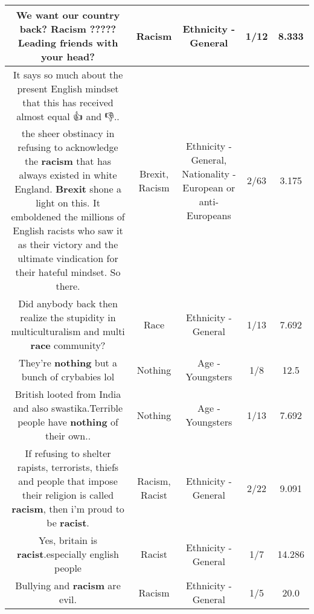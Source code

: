 \documentclass[11pt]{article}
\newlength\mylength
\begin{document}
\begin{center}
\begin{longtable}{|C{.65\mylength}|C{.30\mylength}|C{.12\mylength}|C{.12\mylength}|C{.12\mylength}|}
  \small We want our country back? \textbf{Racism} ????? Leading friends with your head?\normalsize   & Racism & Ethnicity - General & 1/12 & 8.333 \\  \hline
  \small It says so much about the present English mindset that this has received almost equal 👍 and 👎.. the sheer obstinacy in refusing to acknowledge the \textbf{racism} that has always existed in white England. \textbf{Brexit} shone a light on this. It emboldened the millions of English racists who saw it as their victory and the ultimate vindication for their hateful mindset. So there.\normalsize   & Brexit, Racism & Ethnicity - General, Nationality - European or anti-Europeans & 2/63 & 3.175 \\  \hline
  \small Did anybody back then realize  the stupidity in multiculturalism and multi \textbf{race} community?\normalsize   & Race & Ethnicity - General & 1/13 & 7.692 \\  \hline
  \small They're \textbf{nothing} but a bunch of crybabies lol\normalsize   & Nothing & Age - Youngsters & 1/8 & 12.5 \\  \hline
  \small British looted from India and also swastika.Terrible people have \textbf{nothing} of their own..\normalsize   & Nothing & Age - Youngsters & 1/13 & 7.692 \\  \hline
  \small If refusing to shelter rapists, terrorists, thiefs and people that impose their religion is called \textbf{racism}, then i'm proud to be \textbf{racist}.\normalsize   & Racism, Racist & Ethnicity - General & 2/22 & 9.091 \\  \hline
  \small Yes, britain is \textbf{racist}.especially english people\normalsize   & Racist & Ethnicity - General & 1/7 & 14.286 \\  \hline
  \small Bullying and \textbf{racism} are evil.\normalsize   & Racism & Ethnicity - General & 1/5 & 20.0 \\  \hline

\end{longtable}
\end{center}
\end{document}
